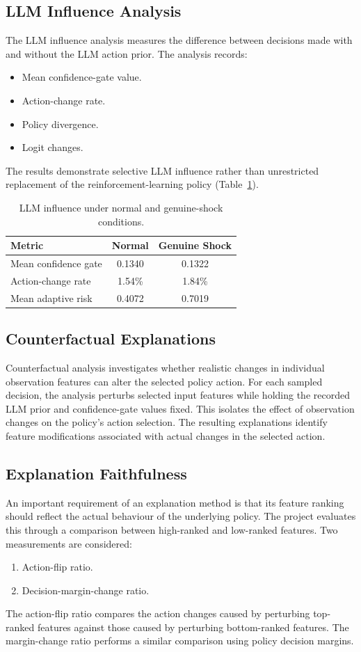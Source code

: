 \documentclass[conference]{IEEEtran}
\begin{document}
\subsection{LLM Influence Analysis}
The LLM influence analysis measures the difference between decisions made with and without the LLM action prior. The analysis records:
\begin{itemize}
  \item Mean confidence-gate value.
  \item Action-change rate.
  \item Policy divergence.
  \item Logit changes.
\end{itemize}
The results demonstrate selective LLM influence rather than unrestricted replacement of the reinforcement-learning policy (Table~\ref{tab:llm}).

\begin{table}[!t]
\centering
\caption{LLM influence under normal and genuine-shock conditions.}
\label{tab:llm}
\small
\begin{tabular}{lcc}
\toprule
\textbf{Metric} & \textbf{Normal} & \textbf{Genuine Shock} \\
\midrule
Mean confidence gate & 0.1340 & 0.1322 \\
Action-change rate   & 1.54\% & 1.84\% \\
Mean adaptive risk   & 0.4072 & 0.7019 \\
\bottomrule
\end{tabular}
\end{table}

\subsection{Counterfactual Explanations}
Counterfactual analysis investigates whether realistic changes in individual observation features can alter the selected policy action. For each sampled decision, the analysis perturbs selected input features while holding the recorded LLM prior and confidence-gate values fixed. This isolates the effect of observation changes on the policy's action selection. The resulting explanations identify feature modifications associated with actual changes in the selected action.

\subsection{Explanation Faithfulness}
An important requirement of an explanation method is that its feature ranking should reflect the actual behaviour of the underlying policy. The project evaluates this through a comparison between high-ranked and low-ranked features. Two measurements are considered:
\begin{enumerate}
  \item Action-flip ratio.
  \item Decision-margin-change ratio.
\end{enumerate}
The action-flip ratio compares the action changes caused by perturbing top-ranked features against those caused by perturbing bottom-ranked features. The margin-change ratio performs a similar comparison using policy decision margins.
\end{document}
